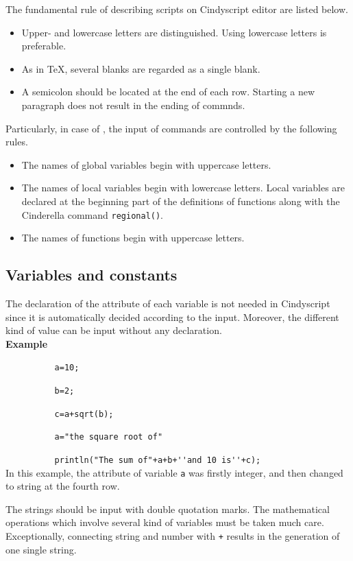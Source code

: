 \documentclass[papersize,a4paper,12pt]{article}
\begin{document}
The fundamental rule of describing scripts on Cindyscript editor 
are listed below. 
\begin{itemize}
\item 
Upper- and lowercase letters are distinguished. 
Using lowercase letters is preferable. 
\item 
As in \TeX , 
several blanks are regarded as a single blank. 
\item 
A semicolon should be located at the end of each row. 
Starting a new paragraph 
does not result in the ending of commnds. 
\end{itemize}
Particularly, in case of \ketcindy , 
the input of commands are controlled 
by the following rules. 
\begin{itemize}
\item 
The names of global variables 
begin with uppercase letters. 
\item 
The names of local variables 
begin with lowercase letters. 
Local variables are declared at the beginning part 
of the definitions of functions 
along with the Cinderella command \verb|regional()|. 
\item 
The names of functions 
begin with uppercase letters. 
\end{itemize}


\subsection{Variables and constants}

The declaration of the attribute of each variable 
is not needed in Cindyscript 
since it is automatically decided 
according to the input. 
Moreover, 
the different kind of value 
can be input without any declaration.  \\

\noindent 
{\bf Example}

\verb|          a=10;|

\verb|          b=2;|

\verb|          c=a+sqrt(b);|

\verb|          a="the square root of"|

\verb|          println("The sum of"+a+b+''and 10 is''+c);|\\

In this example, 
the attribute of variable \verb|a| was firstly integer, 
and then changed to string at the fourth row. 

The strings should be input with double quotation marks. 
The mathematical operations 
which involve several kind of variables 
must be taken much care. 
Exceptionally, 
connecting string and number with \verb|+| 
results in the generation of one single string. 
\end{document}
